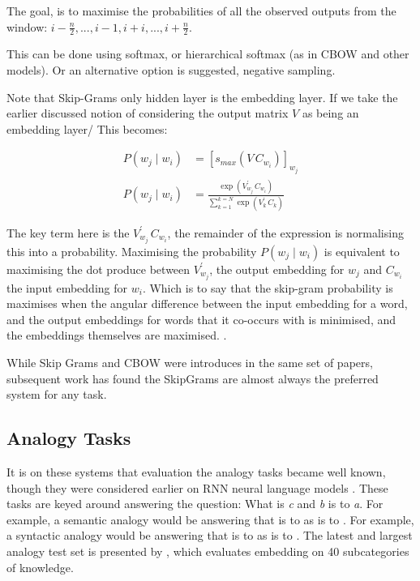 \documentclass[parskip]{komatufte}
\begin{document}
The goal, is to maximise the probabilities of all the observed outputs from the window: $i-\frac{n}{2},...,i-1, i+i,...,i+\frac{n}{2}$.

This can be done using softmax, or hierarchical softmax (as in CBOW and other models).
Or an alternative option is suggested, negative sampling.

Note that Skip-Grams only hidden layer is the embedding layer.
If we take the earlier discussed notion of considering the output matrix $V$ as being an embedding layer/
This becomes:

\begin{align}
P(w_j \mid w_{i}) & = \left[ s_{max}(V\,C_{w_{i}}) \right]_{w_j} \\
P(w_j \mid w_{i}) & = \frac{\exp(V_{w_j}^\prime\,C_{w_{i}})}{\sum_{k=1}^{k=N} \exp(V_k^\prime\,C_{k})}
\end{align}

The key term here is the $V_{w_j}^\prime\,C_{w_{i}}$,
the remainder of the expression is normalising this into a probability.
Maximising the probability $P(w_j \mid w_{i})$ is equivalent to maximising the dot produce between $V_{w_j}^\prime$, the output embedding for $w_j$ and  $C_{w_i}$ the input embedding for $w_i$.
Which is to say that the skip-gram probability is maximises when the angular difference between the input embedding for a word, and the output embeddings for words that it co-occurs with is minimised, and the embeddings themselves are maximised.
.


While Skip Grams and CBOW were introduces in the same set of papers, subsequent work has found the SkipGrams are almost always the preferred system for any task. 

\subsection{Analogy Tasks}

It is on these systems that evaluation the analogy tasks became well known, though they were considered earlier on RNN neural language models .
These tasks are keyed around answering the question: What is  \emph{c} and \emph{b} is to \emph{a}.
For example, a semantic analogy would be answering that  is to  as  is to .
For example, a syntactic analogy would be answering that  is to  as  is to .
The latest and largest analogy test set is presented by ,
which evaluates embedding on 40 subcategories of knowledge.
\end{document}
